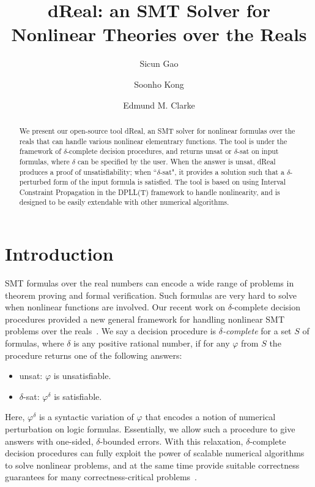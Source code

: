 \documentclass[envcountsect]{llncs}
\title{{\sf dReal}: an SMT Solver for Nonlinear Theories over the Reals}
\author{Sicun Gao \and Soonho Kong \and Edmund M. Clarke}
\institute{Carnegie Mellon University, Pittsburgh, PA 15213}
\begin{document}
\maketitle

\begin{abstract}
We present our open-source tool {\sf dReal}, an SMT solver for
nonlinear formulas over the reals that can handle various nonlinear elementrary
functions. The tool is under the framework of $\delta$-complete decision
procedures, and returns {\sf unsat} or {\sf $\delta$-sat} on input formulas,
where $\delta$ can be specified by the user. When the answer is {\sf unsat},
{\sf dReal} produces a proof of unsatisfiability; when ``$\delta$-sat", it
provides a solution such that a $\delta$-perturbed form of the input formula is
satisfied. The tool is based on using Interval Constraint Propagation in the
DPLL(T) framework to handle nonlinearity, and is
designed to be easily extendable with other numerical algorithms.
\end{abstract}

\section{Introduction}

SMT formulas over the real numbers can encode a wide range of problems in
theorem proving and formal verification. Such formulas are very hard to solve
when nonlinear functions are involved. Our recent work on
{$\delta$-complete decision procedures} provided a new general framework for
handling nonlinear SMT problems over the reals~\cite{DBLP:conf/cade/GaoAC12}. We say a decision
procedure is {\em $\delta$-complete} for a set $S$ of formulas, where $\delta$
is any positive rational number, if for any $\varphi$ from $S$ the procedure
returns one of the following answers:
\begin{itemize}
 \item {\sf unsat}: $\varphi$ is unsatisfiable.
 \item {\sf $\delta$-sat}: $\varphi^{\delta}$ is satisfiable.
\end{itemize}
Here, $\varphi^{\delta}$ is a syntactic variation of $\varphi$ that encodes a
notion of numerical perturbation on logic formulas. Essentially, we allow such a
procedure to give answers with one-sided, $\delta$-bounded errors. With this
relaxation, $\delta$-complete decision procedures can fully exploit the
power of scalable numerical algorithms to solve nonlinear
problems, and at the same time provide suitable correctness
guarantees for many correctness-critical problems~\cite{}.
\end{document}
